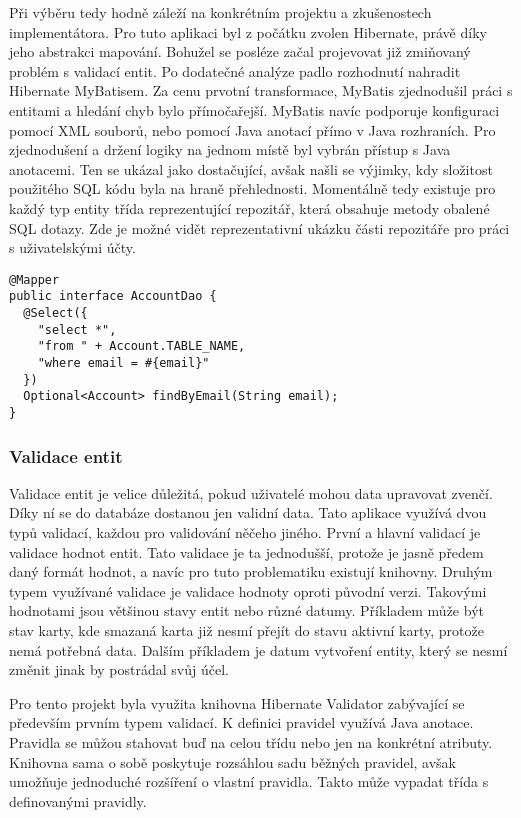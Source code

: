 		Při výběru tedy hodně záleží na konkrétním projektu a zkušenostech implementátora.
		Pro tuto aplikaci byl z počátku zvolen Hibernate, právě díky jeho abstrakci mapování.
		Bohužel se posléze začal projevovat již zmiňovaný problém s validací entit.
		Po dodatečné analýze padlo rozhodnutí nahradit Hibernate MyBatisem.
		Za cenu prvotní transformace, MyBatis zjednodušil práci s entitami a hledání chyb bylo přímočařejší.
		MyBatis navíc podporuje konfiguraci pomocí \ac{XML} souborů, nebo pomocí Java anotací přímo v Java rozhraních.
		Pro zjednodušení a držení logiky na jednom místě byl vybrán přístup s Java anotacemi.
		Ten se ukázal jako dostačující, avšak našli se výjimky, kdy složitost použitého \ac{SQL} kódu
		byla na hraně přehlednosti.
		Momentálně tedy existuje pro každý typ entity třída reprezentující repozitář, která obsahuje metody obalené \ac{SQL}
		dotazy.
		Zde je možné vidět reprezentativní ukázku části repozitáře pro práci s uživatelskými účty.

		\begin{codeblock}
			\begin{verbatim}
@Mapper
public interface AccountDao {
  @Select({
    "select *",
    "from " + Account.TABLE_NAME,
    "where email = #{email}"
  })
  Optional<Account> findByEmail(String email);
}
			\end{verbatim}
		\end{codeblock}

		\subsubsection{Validace entit}

		Validace entit je velice důležitá, pokud uživatelé mohou data upravovat zvenčí.
		Díky ní se do databáze dostanou jen validní data.
		Tato aplikace využívá dvou typů validací, každou pro validování něčeho jiného.
		První a hlavní validací je validace hodnot entit.
		Tato validace je ta jednodušší, protože je jasně předem daný formát hodnot, a navíc pro tuto problematiku existují knihovny.
		Druhým typem využívané validace je validace hodnoty oproti původní verzi.
		Takovými hodnotami jsou většinou stavy entit nebo různé datumy.
		Příkladem může být stav karty, kde smazaná karta již nesmí přejít do stavu aktivní karty, protože nemá potřebná data.
		Dalším příkladem je datum vytvoření entity, který se nesmí změnit jinak by postrádal svůj účel.

		Pro tento projekt byla využita knihovna Hibernate Validator zabývající se především prvním typem validací.
		K definici pravidel využívá Java anotace.
		Pravidla se můžou stahovat buď na celou třídu nebo jen na konkrétní atributy.
		Knihovna sama o sobě poskytuje rozsáhlou sadu běžných pravidel, avšak umožňuje jednoduché rozšíření o vlastní
		pravidla.
		Takto může vypadat třída s definovanými pravidly.

